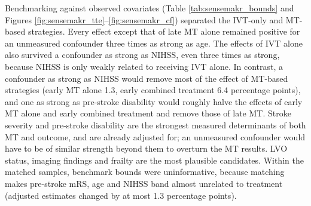 Benchmarking against observed covariates (Table \ref{tab:sensemakr_bounds} and Figures \ref{fig:sensemakr_tte}--\ref{fig:sensemakr_cf}) separated the IVT-only and MT-based strategies. Every effect except that of late MT alone remained positive for an unmeasured confounder three times as strong as age. The effects of IVT alone also survived a confounder as strong as NIHSS, even three times as strong, because NIHSS is only weakly related to receiving IVT alone. In contrast, a confounder as strong as NIHSS would remove most of the effect of MT-based strategies (early MT alone 1.3, early combined treatment 6.4 percentage points), and one as strong as pre-stroke disability would roughly halve the effects of early MT alone and early combined treatment and remove those of late MT. Stroke severity and pre-stroke disability are the strongest measured determinants of both MT and outcome, and are already adjusted for; an unmeasured confounder would have to be of similar strength beyond them to overturn the MT results. LVO status, imaging findings and frailty are the most plausible candidates. Within the matched samples, benchmark bounds were uninformative, because matching makes pre-stroke mRS, age and NIHSS band almost unrelated to treatment (adjusted estimates changed by at most 1.3 percentage points).

